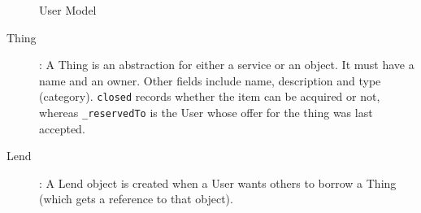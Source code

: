 \begin{figure}[!h]
\centering
{}
\caption{User Model} \label{fig:user-model}
\end{figure}

\begin{description}
	\item [Thing] : A Thing is an abstraction for either a service or an object. It must have a name and an owner. Other fields include name, description and type (category). \texttt{closed} records whether the item can be acquired or not, whereas \texttt{\_reservedTo} is the User whose offer for the thing was last accepted.
	\item [Lend] : A Lend object is created when a User wants others to borrow a Thing (which gets a reference to that object).
\end{description}

